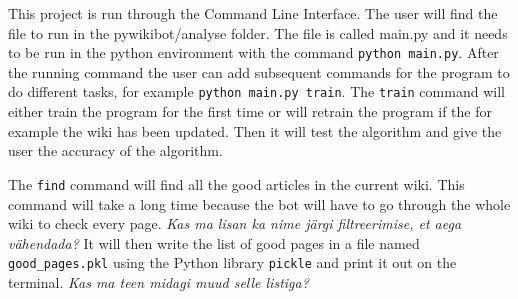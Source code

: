 This project is run through the Command Line Interface. The user will find the file to run in the pywikibot/analyse folder. The file is called main.py and it needs to be run in the python environment with the command \verb;python main.py;. After the running command the user can add subsequent commands for the program to do different tasks, for example \verb;python main.py train;. The \verb;train; command will either train the program for the first time or will retrain the program if the for example the wiki has been updated. Then it will test the algorithm and give the user the accuracy of the algorithm.

The \verb;find; command will find all the good articles in the current wiki. This command will take a long time because the bot will have to go through the whole wiki to check every page. \emph{Kas ma lisan ka nime järgi filtreerimise, et aega vähendada?} It will then write the list of good pages in a file named \verb;good_pages.pkl; using the Python library \verb;pickle; and print it out on the terminal. \emph{Kas ma teen midagi muud selle listiga?}
